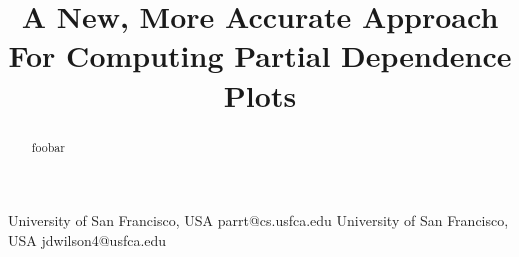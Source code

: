 \documentclass[10pt]{sigplanconf}
\begin{document}
\setlength{\pdfpageheight}{\paperheight}
\setlength{\pdfpagewidth}{\paperwidth}

\title{A New, More Accurate Approach For Computing Partial Dependence Plots}

           {University of San Francisco, USA\vspace{-1mm}}
           {parrt@cs.usfca.edu}
           {University of San Francisco, USA\vspace{-1mm}}
           {jdwilson4@usfca.edu}

\maketitle

\begin{abstract}
foobar
\end{abstract}

\cite{PDP} \cite{ICE}





\vfill\eject




\end{document}
